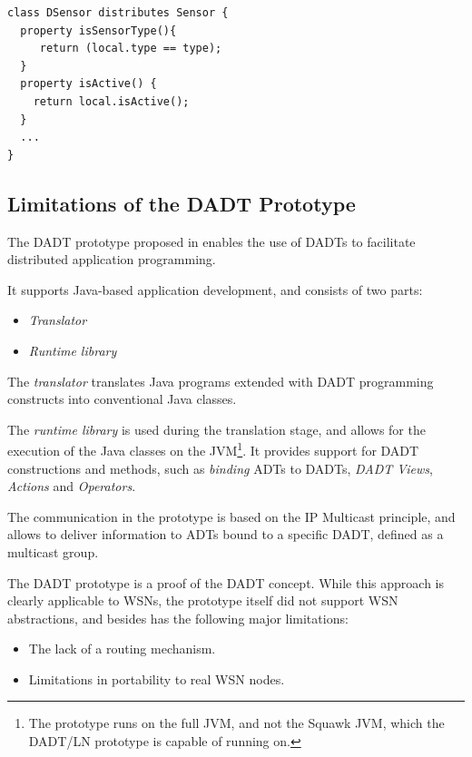 \begin{lstlisting}[frame=trbl, basewidth={0.55em, 0.6em}, captionpos=b, 
basicstyle=\ttfamily\footnotesize, breaklines, caption = Definition of DADT Properties, label = listing:DADTProperty ]  
class DSensor distributes Sensor {
  property isSensorType(){
	 return (local.type == type);
  }
  property isActive() {
	return local.isActive();
  }
  ...
}

\end{lstlisting}


\subsection{Limitations of the DADT Prototype}

The DADT prototype proposed in \cite{migliavacca_DADT:2006} enables the use of
DADTs to facilitate distributed application programming.

It supports Java-based application development, and consists of two parts:
\begin{itemize}
  \item \emph{Translator}
  \item \emph{Runtime library} 
\end{itemize}

The \emph{translator} translates Java programs
  extended with DADT programming constructs into conventional Java classes.

The \emph{runtime library} is used during the translation stage, and allows for the execution of the Java classes on the JVM\footnote{The prototype runs on the full JVM, and not the Squawk JVM, which the DADT/LN prototype is capable of running on.}. It provides support for DADT constructions and methods, such as
\emph{binding} ADTs to DADTs, \emph{DADT Views}, \emph{Actions} and
\emph{Operators}. 

The communication in the prototype is based on the IP Multicast principle, and
allows to deliver information to ADTs bound to a specific DADT, defined as
a multicast group.

The DADT prototype is a proof of the DADT concept. While this
approach is clearly applicable to WSNs, the prototype itself did not support WSN
abstractions, and besides has the following major limitations:

\begin{itemize}
  \item The lack of a routing mechanism.
  \item Limitations in portability to real WSN nodes.
\end{itemize}

